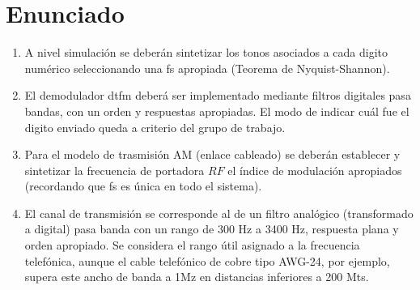 \section{Enunciado}
\begin{enumerate}[label=\alph*)]
  \item A nivel simulación se deberán sintetizar
        los tonos asociados a cada digito
        numérico seleccionando una \gls{fs} apropiada (Teorema de Nyquist-Shannon).
  \item El demodulador \gls{dtfm} deberá ser
        implementado mediante filtros
        digitales pasa bandas, con un
        orden y respuestas apropiadas. El
        modo de indicar cuál fue el digito
        enviado queda a criterio del grupo
        de trabajo.
  \item Para el modelo de trasmisión AM
        (enlace cableado) se deberán
        establecer y sintetizar la frecuencia
        de portadora $RF$ el índice de
        modulación apropiados
        (recordando que \gls{fs} es única en
        todo el sistema).
  \item El canal de transmisión se
        corresponde al de un filtro
        analógico (transformado a digital)
        pasa banda con un rango de 300 Hz
        a 3400 Hz, respuesta plana y orden
        apropiado. Se considera el rango
        útil asignado a la frecuencia
        telefónica, aunque el cable
        telefónico de cobre tipo AWG-24,
        por ejemplo, supera este ancho de
        banda a 1Mz en distancias
        inferiores a 200 Mts.
\end{enumerate}

